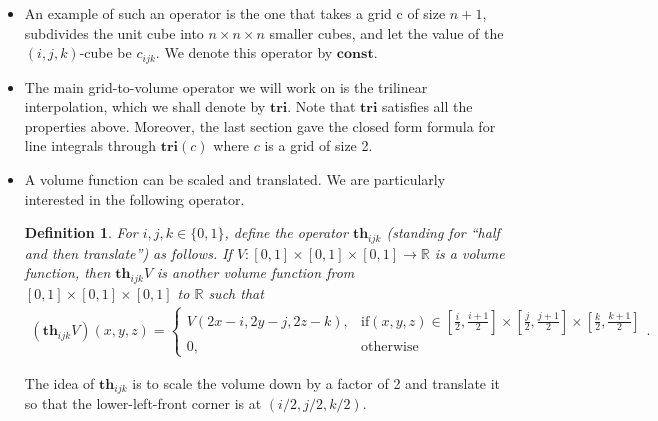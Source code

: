 \documentclass[10pt]{article}
\newtheorem{definition}[lemma]{Definition}
\newcommand{\Tri}{\mathbf{tri}}
\newcommand{\Th}{\mathbf{th}}
\newcommand{\V}{\mathbf{V}}
\newcommand{\Const}{\mathbf{const}}
\begin{document}
\begin{itemize}
\begin{definition}
\begin{itemize}
	        More precisely, let $c$ be a grid of size 
	        $n+1$. Then, the values of 
	        $$\V(c)^{[i_0/n,i_1/n]\times[j_0/n,j_1/n]
	        \times[k_0/n,k_1/n]}$$ depends only on
	        $$c^{i_0:i_1+1,j_0:j_1+1,k_0:k_1+1}.$$
    \end{itemize}
    \end{definition}
    
    In general, we denote such a function 
    with a boldfaced name such as $\V$.    
    
    \item An example of such an operator is the one
    that takes a grid c of size $n+1$,
    subdivides the unit cube into $n \times n \times n$
    smaller cubes, and let the value of the $(i,j,k)$-cube
    be $c_{ijk}.$ We denote this operator by $\Const$.
    
    \item The main grid-to-volume operator we will work on
        is the trilinear interpolation, which we shall
        denote by $\Tri$. Note that $\Tri$ satisfies all the
        properties above. Moreover, the last section
        gave the closed form formula for line integrals
        through $\Tri(c)$ where $c$ is a grid of size 2.
		
	\item A volume function can be scaled and translated.
	    We are particularly interested in the following
	    operator.
	    	    
	    \begin{definition}
	    For $i,j,k \in \{0,1\}$, define the operator 
	    $\Th_{ijk}$ (standing for ``half and then translate'') 
	    as follows. If 
	    $V: [0,1]\times[0,1]\times[0,1] \rightarrow \mathbb{R}$
	    is a volume function, then $\Th_{ijk}V$ 
	    is another volume function from $[0,1]\times[0,1]\times[0,1]$
	    to $\mathbb{R}$ such that
	    \begin{align*}
	        (\Th_{ijk}V)(x,y,z) = \begin{cases}
	            V(2x - i, 2y-j, 2z-k), & \mbox{if}(x,y,z)
	            \in [\frac{i}{2},\frac{i+1}{2}] 
	            \times [\frac{j}{2},\frac{j+1}{2}] 
	            \times [\frac{k}{2},\frac{k+1}{2}]\\
	            0, & \mbox{otherwise}
            \end{cases}.
	    \end{align*}
        \end{definition}
	    
	    The idea of $\Th_{ijk}$ is to scale the volume
	    down by a factor of 2 and translate it so that
	    the lower-left-front corner is at $(i/2,j/2,k/2)$.
	

\end{itemize}
\end{document}
